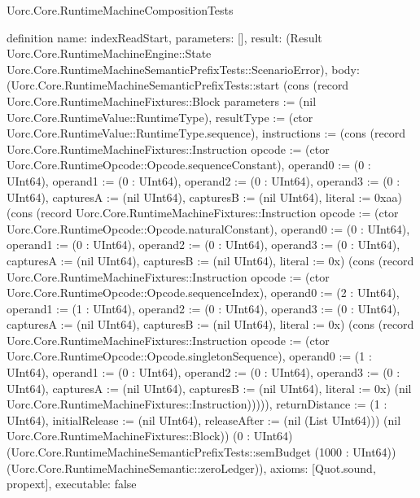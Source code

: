 \begin{lexlean}{Uorc.Core.RuntimeMachineCompositionTests}
\begin{semanticmodule}
definition{
  name: indexReadStart,
  parameters: [],
  result: (Result Uorc.Core.RuntimeMachineEngine::State Uorc.Core.RuntimeMachineSemanticPrefixTests::ScenarioError),
  body: (Uorc.Core.RuntimeMachineSemanticPrefixTests::start (cons (record Uorc.Core.RuntimeMachineFixtures::Block {parameters := (nil Uorc.Core.RuntimeValue::RuntimeType), resultType := (ctor Uorc.Core.RuntimeValue::RuntimeType.sequence), instructions := (cons (record Uorc.Core.RuntimeMachineFixtures::Instruction {opcode := (ctor Uorc.Core.RuntimeOpcode::Opcode.sequenceConstant), operand0 := (0 : UInt64), operand1 := (0 : UInt64), operand2 := (0 : UInt64), operand3 := (0 : UInt64), capturesA := (nil UInt64), capturesB := (nil UInt64), literal := 0xaa}) (cons (record Uorc.Core.RuntimeMachineFixtures::Instruction {opcode := (ctor Uorc.Core.RuntimeOpcode::Opcode.naturalConstant), operand0 := (0 : UInt64), operand1 := (0 : UInt64), operand2 := (0 : UInt64), operand3 := (0 : UInt64), capturesA := (nil UInt64), capturesB := (nil UInt64), literal := 0x}) (cons (record Uorc.Core.RuntimeMachineFixtures::Instruction {opcode := (ctor Uorc.Core.RuntimeOpcode::Opcode.sequenceIndex), operand0 := (2 : UInt64), operand1 := (1 : UInt64), operand2 := (0 : UInt64), operand3 := (0 : UInt64), capturesA := (nil UInt64), capturesB := (nil UInt64), literal := 0x}) (cons (record Uorc.Core.RuntimeMachineFixtures::Instruction {opcode := (ctor Uorc.Core.RuntimeOpcode::Opcode.singletonSequence), operand0 := (1 : UInt64), operand1 := (0 : UInt64), operand2 := (0 : UInt64), operand3 := (0 : UInt64), capturesA := (nil UInt64), capturesB := (nil UInt64), literal := 0x}) (nil Uorc.Core.RuntimeMachineFixtures::Instruction))))), returnDistance := (1 : UInt64), initialRelease := (nil UInt64), releaseAfter := (nil (List UInt64))}) (nil Uorc.Core.RuntimeMachineFixtures::Block)) (0 : UInt64) (Uorc.Core.RuntimeMachineSemanticPrefixTests::semBudget (1000 : UInt64)) (Uorc.Core.RuntimeMachineSemantic::zeroLedger)),
  axioms: [Quot.sound, propext],
  executable: false
}


\end{semanticmodule}
\end{lexlean}
